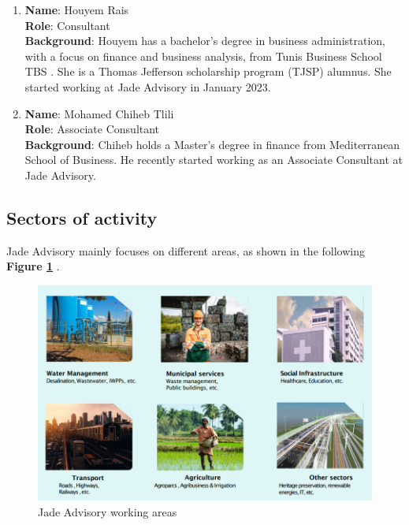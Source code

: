 \begin{enumerate}
    \item \textbf{Name}: Houyem Rais \\
    \textbf{Role}: Consultant \\
    \textbf{Background}: Houyem has a bachelor's degree in business administration, with a focus on finance and business analysis, from Tunis Business School TBS . She is a Thomas Jefferson scholarship program (TJSP) alumnus. She started working at Jade Advisory in January 2023.%

    \item \textbf{Name}: Mohamed Chiheb Tlili \\
    \textbf{Role}: Associate Consultant \\
    \textbf{Background}: Chiheb holds a Master's degree in finance from Mediterranean School of Business. He recently started working as an Associate Consultant at Jade Advisory.%
    
    
\end{enumerate}



\subsection{Sectors of activity}
Jade Advisory mainly focuses on different areas, as shown in the following \textbf{Figure \ref{fig2} } .
\begin{figure}[H]
    \centering
    \includegraphics[width=0.9 \linewidth]{assets/jade-sectors.png}
    \caption{Jade Advisory working areas}
    \label{fig2}
\end{figure}
